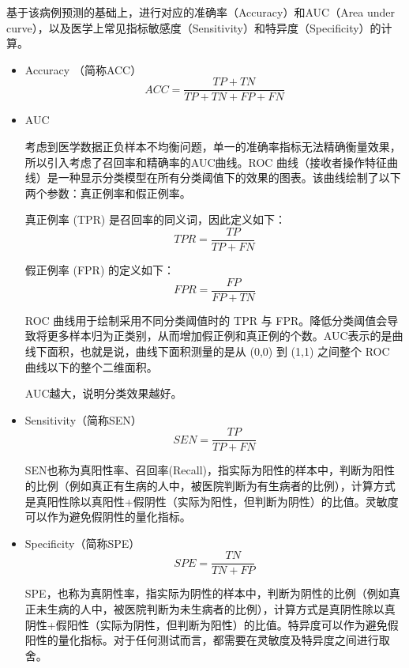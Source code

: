 基于该病例预测的基础上，进行对应的准确率（Accuracy）和AUC（Area under curve）\cite{35Bradley1997The}，以及医学上常见指标敏感度（Sensitivity）和特异度（Specificity）的计算。
\begin{itemize}
	\item Accuracy （简称ACC）
	\begin{equation}
		ACC=\frac{T P+T N}{T P+T N+F P+F N}
	\end{equation}
	
	\item AUC
	
	考虑到医学数据正负样本不均衡问题，单一的准确率指标无法精确衡量效果，所以引入考虑了召回率和精确率的AUC曲线。ROC 曲线（接收者操作特征曲线）是一种显示分类模型在所有分类阈值下的效果的图表。该曲线绘制了以下两个参数：真正例率和假正例率。
	
真正例率 (TPR) 是召回率的同义词，因此定义如下：
\begin{equation}
	T P R=\frac{T P}{T P+F N}
\end{equation}

假正例率 (FPR) 的定义如下：
\begin{equation}
	F P R=\frac{F P}{F P+T N}
\end{equation}

ROC 曲线用于绘制采用不同分类阈值时的 TPR 与 FPR。降低分类阈值会导致将更多样本归为正类别，从而增加假正例和真正例的个数。AUC表示的是曲线下面积，也就是说，曲线下面积测量的是从 (0,0) 到 (1,1) 之间整个 ROC 曲线以下的整个二维面积。	

AUC越大，说明分类效果越好。

	\item Sensitivity（简称SEN）
	\begin{equation}
		SEN =\frac{T P}{T P+F N}
	\end{equation}
	
	SEN也称为真阳性率、召回率(Recall)，指实际为阳性的样本中，判断为阳性的比例（例如真正有生病的人中，被医院判断为有生病者的比例），计算方式是真阳性除以真阳性+假阴性（实际为阳性，但判断为阴性）的比值。灵敏度可以作为避免假阴性的量化指标。
		
	\item Specificity（简称SPE）
	\begin{equation}
		SPE	=\frac{T N}{T N+F P}
	\end{equation}
	
	SPE，也称为真阴性率，指实际为阴性的样本中，判断为阴性的比例（例如真正未生病的人中，被医院判断为未生病者的比例），计算方式是真阴性除以真阴性+假阳性（实际为阴性，但判断为阳性）的比值。特异度可以作为避免假阳性的量化指标。对于任何测试而言，都需要在灵敏度及特异度之间进行取舍。
\end{itemize}

